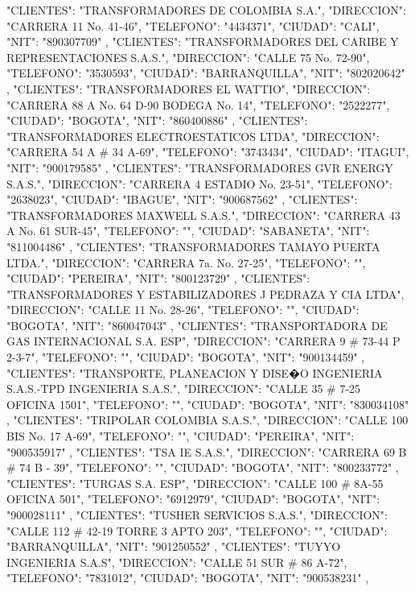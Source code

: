    {
   "CLIENTES": "TRANSFORMADORES DE COLOMBIA S.A.",
   "DIRECCION": "CARRERA 11 No. 41-46",
   "TELEFONO": "4434371",
   "CIUDAD": "CALI",
   "NIT": "890307709"
   },
   {
   "CLIENTES": "TRANSFORMADORES DEL CARIBE Y REPRESENTACIONES S.A.S.",
   "DIRECCION": "CALLE 75 No. 72-90",
   "TELEFONO": "3530593",
   "CIUDAD": "BARRANQUILLA",
   "NIT": "802020642"
   },
   {
   "CLIENTES": "TRANSFORMADORES EL WATTIO",
   "DIRECCION": "CARRERA 88 A No. 64 D-90 BODEGA No. 14",
   "TELEFONO": "2522277",
   "CIUDAD": "BOGOTA",
   "NIT": "860400886"
   },
   {
   "CLIENTES": "TRANSFORMADORES ELECTROESTATICOS LTDA",
   "DIRECCION": "CARRERA 54 A # 34 A-69",
   "TELEFONO": "3743434",
   "CIUDAD": "ITAGUI",
   "NIT": "900179585"
   },
   {
   "CLIENTES": "TRANSFORMADORES GVR ENERGY S.A.S.",
   "DIRECCION": "CARRERA 4 ESTADIO No. 23-51",
   "TELEFONO": "2638023",
   "CIUDAD": "IBAGUE",
   "NIT": "900687562"
   },
   {
   "CLIENTES": "TRANSFORMADORES MAXWELL S.A.S.",
   "DIRECCION": "CARRERA 43 A No. 61 SUR-45",
   "TELEFONO": "",
   "CIUDAD": "SABANETA",
   "NIT": "811004486"
   },
   {
   "CLIENTES": "TRANSFORMADORES TAMAYO PUERTA LTDA.",
   "DIRECCION": "CARRERA 7a. No. 27-25",
   "TELEFONO": "",
   "CIUDAD": "PEREIRA",
   "NIT": "800123729"
   },
   {
   "CLIENTES": "TRANSFORMADORES Y ESTABILIZADORES J PEDRAZA Y CIA LTDA",
   "DIRECCION": "CALLE 11 No. 28-26",
   "TELEFONO": "",
   "CIUDAD": "BOGOTA",
   "NIT": "860047043"
   },
   {
   "CLIENTES": "TRANSPORTADORA DE GAS INTERNACIONAL S.A. ESP",
   "DIRECCION": "CARRERA 9 # 73-44 P 2-3-7",
   "TELEFONO": "",
   "CIUDAD": "BOGOTA",
   "NIT": "900134459"
   },
   {
   "CLIENTES": "TRANSPORTE, PLANEACION Y DISE�O INGENIERIA S.A.S.-TPD INGENIERIA S.A.S.",
   "DIRECCION": "CALLE 35 # 7-25 OFICINA 1501",
   "TELEFONO": "",
   "CIUDAD": "BOGOTA",
   "NIT": "830034108"
   },
   {
   "CLIENTES": "TRIPOLAR COLOMBIA S.A.S.",
   "DIRECCION": "CALLE 100 BIS No. 17 A-69",
   "TELEFONO": "",
   "CIUDAD": "PEREIRA",
   "NIT": "900535917"
   },
   {
   "CLIENTES": "TSA IE S.A.S.",
   "DIRECCION": "CARRERA 69 B # 74 B - 39",
   "TELEFONO": "",
   "CIUDAD": "BOGOTA",
   "NIT": "800233772"
   },
   {
   "CLIENTES": "TURGAS S.A. ESP",
   "DIRECCION": "CALLE 100 # 8A-55 OFICINA 501",
   "TELEFONO": "6912979",
   "CIUDAD": "BOGOTA",
   "NIT": "900028111"
   },
   {
   "CLIENTES": "TUSHER SERVICIOS S.A.S.",
   "DIRECCION": "CALLE 112 # 42-19 TORRE 3 APTO 203",
   "TELEFONO": "",
   "CIUDAD": "BARRANQUILLA",
   "NIT": "901250552"
   },
   {
   "CLIENTES": "TUYYO INGENIERIA S.A.S",
   "DIRECCION": "CALLE 51 SUR # 86 A-72",
   "TELEFONO": "7831012",
   "CIUDAD": "BOGOTA",
   "NIT": "900538231"
   },

